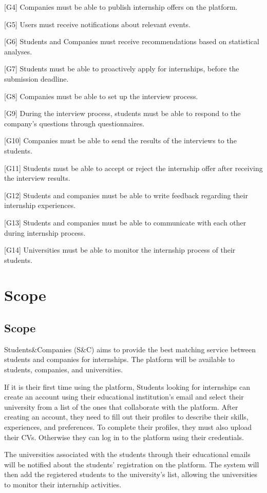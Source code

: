 [G4] Companies must be able to publish internship offers on the platform.

[G5] Users must receive notifications about relevant events.

[G6] Students and Companies must receive recommendations based on statistical analyses.

[G7] Students must be able to proactively apply for internships, before the submission deadline.

[G8] Companies must be able to set up the interview process.

[G9] During the interview process, students must be able to respond to the company's questions through questionnaires.

[G10] Companies must be able to send the results of the interviews to the students.

[G11] Students must be able to accept or reject the internship offer after receiving the interview results.

[G12] Students and companies must be able to write feedback regarding their internship experiences.

[G13] Students and companies must be able to communicate with each other during internship process.

[G14] Universities must be able to monitor the internship process of their students.


\newpage
\section{Scope}\label{sec:scope}
\subsection{Scope}\label{subsec:scope}
Students\&Companies (S\&C) aims to provide the best matching service between students and companies for internships. The platform will be available
to students, companies, and universities.

If it is their first time using the platform, Students looking for internships can create an account using their educational institution's email and 
select their university from a list of the ones that collaborate with the platform. 
After creating an account, they need to fill out their profiles to describe their skills, experiences, and preferences. To complete
their profiles, they must also upload their CVs.
Otherwise they can log in to the platform using their credentials.

The universities associated with the students through their educational emails will be notified about the students' registration on the platform. 
The system will then add the registered students to the university’s list, allowing the universities to monitor their internship activities.

